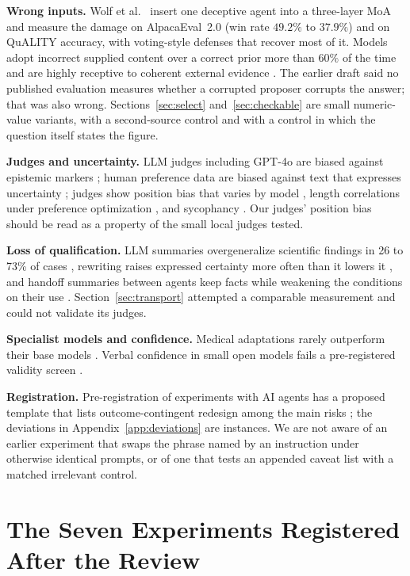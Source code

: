 \documentclass[10pt,twocolumn]{article}
\begin{document}
\textbf{Wrong inputs.} Wolf et al.\ \cite{wolf2025doge} insert one
deceptive agent into a three-layer MoA and measure the damage on
AlpacaEval~2.0 (win rate $49.2\%$ to $37.9\%$) and on QuALITY accuracy,
with voting-style defenses that recover most of it. Models adopt
incorrect supplied content over a correct prior more than $60\%$ of the
time \cite{wu2024clasheval} and are highly receptive to coherent
external evidence \cite{xie2024chameleon}. The earlier draft said no
published evaluation measures whether a corrupted proposer corrupts the
answer; that was also wrong. Sections~\ref{sec:select}
and~\ref{sec:checkable} are small numeric-value variants, with a
second-source control and with a control in which the question itself
states the figure.

\textbf{Judges and uncertainty.} LLM judges including GPT-4o are biased
against epistemic markers \cite{lee2025judges}; human preference data
are biased against text that expresses uncertainty
\cite{zhou2024relying}; judges show position bias that varies by model
\cite{zheng2023judging}, length correlations under preference
optimization \cite{singhal2023length}, and sycophancy
\cite{sharma2023sycophancy}. Our judges' position bias should be read
as a property of the small local judges tested.

\textbf{Loss of qualification.} LLM summaries overgeneralize scientific
findings in 26 to 73\% of cases \cite{peters2025generalization},
rewriting raises expressed certainty more often than it lowers it
\cite{belem2026may}, and handoff summaries between agents keep facts
while weakening the conditions on their use \cite{wang2026facts}.
Section~\ref{sec:transport} attempted a comparable measurement and
could not validate its judges.

\textbf{Specialist models and confidence.} Medical adaptations rarely
outperform their base models \cite{jeong2024medical}. Verbal confidence
in small open models fails a pre-registered validity screen
\cite{cacioli2026verbal}.

\textbf{Registration.} Pre-registration of experiments with AI agents
has a proposed template that lists outcome-contingent redesign among
the main risks \cite{vaccaro2026prereg}; the deviations in
Appendix~\ref{app:deviations} are instances. We are not aware of an
earlier experiment that swaps the phrase named by an instruction under
otherwise identical prompts, or of one that tests an appended caveat
list with a matched irrelevant control.

\section{The Seven Experiments Registered After the Review}
\label{sec:planned}
\end{document}
